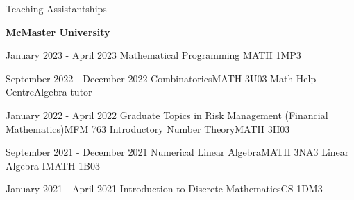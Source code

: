 \begin{rSection}{Teaching Assistantships}

\underline{\textbf{McMaster University}}

\begin{taSubsectionNoInst}
    {January 2023 - April 2023}
    {Mathematical Programming}
    {MATH 1MP3}
\end{taSubsectionNoInst}

\begin{taSubsectionNoInstDouble}
    {September 2022 - December 2022}
    {Combinatorics}{MATH 3U03}
    {Math Help Centre}{Algebra tutor}
\end{taSubsectionNoInstDouble}

\begin{taSubsectionNoInstDouble}
    {January 2022 - April 2022}
    {Graduate Topics in Risk Management (Financial Mathematics)}{MFM 763}
    {Introductory Number Theory}{MATH 3H03}
\end{taSubsectionNoInstDouble}

\begin{taSubsectionNoInstDouble}
    {September 2021 - December 2021}
    {Numerical Linear Algebra}{MATH 3NA3}
    {Linear Algebra I}{MATH 1B03}
\end{taSubsectionNoInstDouble}

\begin{taSubsectionNoInst}
    {January 2021 - April 2021}
    {Introduction to Discrete Mathematics}{CS 1DM3}
\end{taSubsectionNoInst}

\end{rSection}